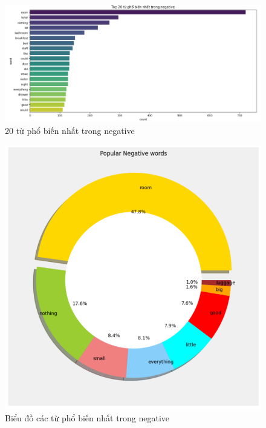 \begin{enumerate}
     \begin{figure}[H]
        \centering
        \includegraphics[width=1\linewidth]{Figures/8.6.png}
        \caption{20 từ phổ biến nhất trong negative}
        \label{fig:enter-label}
    \end{figure}

     \begin{figure}[H]
        \centering
        \includegraphics[width=1\linewidth]{Figures/8.7.png}
        \caption{Biểu đồ các từ phổ biến nhất trong negative}
        \label{fig:enter-label}
    \end{figure}


\end{enumerate}

